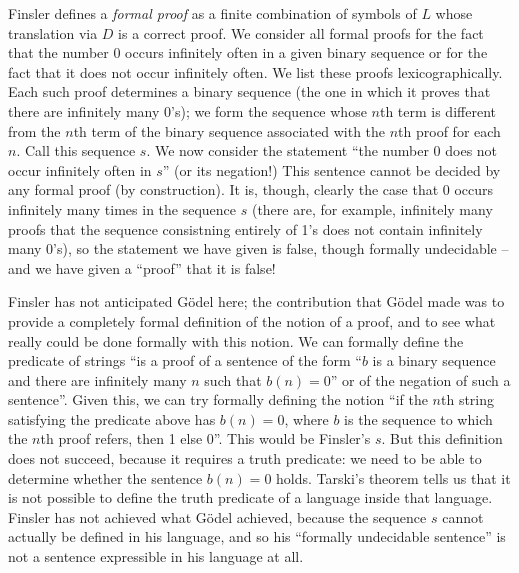 Finsler defines a {\em formal proof\/} as a finite combination of
symbols of $L$ whose translation via $D$ is a correct proof.  We
consider all formal proofs for the fact that the number 0 occurs
infinitely often in a given binary sequence or for the fact that it
does not occur infinitely often.  We list these proofs
lexicographically.  Each such proof determines a binary sequence (the
one in which it proves that there are infinitely many 0's); we form
the sequence whose $n$th term is different from the $n$th term of the
binary sequence associated with the $n$th proof for each $n$.  Call
this sequence $s$.  We now consider the statement ``the number 0 does
not occur infinitely often in $s$'' (or its negation!)  This sentence
cannot be decided by any formal proof (by construction).  It is,
though, clearly the case that 0 occurs infinitely many times in the
sequence $s$ (there are, for example, infinitely many proofs that the
sequence consistning entirely of 1's does not contain infinitely many
0's), so the statement we have given is false, though formally
undecidable -- and we have given a ``proof'' that it is false!

Finsler has not anticipated G\"odel here; the contribution that
G\"odel made was to provide a completely formal definition of the
notion of a proof, and to see what really could be done formally with
this notion.  We can formally define the predicate of strings ``is a
proof of a sentence of the form ``$b$ is a binary sequence and there
are infinitely many $n$ such that $b(n)=0$'' or of the negation of
such a sentence''.  Given this, we can try formally defining the
notion ``if the $n$th string satisfying the predicate above has
$b(n)=0$, where $b$ is the sequence to which the $n$th proof refers,
then 1 else 0''.  This would be Finsler's $s$.  But this definition
does not succeed, because it requires a truth predicate: we need to be
able to determine whether the sentence $b(n)=0$ holds.  Tarski's
theorem tells us that it is not possible to define the truth predicate
of a language inside that language.  Finsler has not achieved what
G\"odel achieved, because the sequence $s$ cannot actually be defined
in his language, and so his ``formally undecidable sentence'' is not a
sentence expressible in his language at all.

